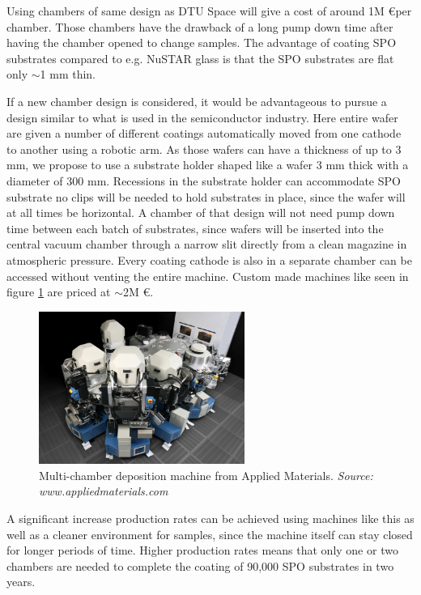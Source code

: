 Using chambers of same design as DTU Space will give a cost of around 1M \euro per chamber. Those chambers have the drawback of a long pump down time after having the chamber opened to change samples. The advantage of coating SPO substrates compared to e.g. NuSTAR glass is that the SPO substrates are flat only $\sim$1 mm thin.

If a new chamber design is considered, it would be advantageous to pursue a design similar to what is used in the semiconductor industry. Here entire wafer are given a number of different coatings automatically moved from one cathode to another using a robotic arm. As those wafers can have a thickness of up to 3 mm, we propose to use a substrate holder shaped like a wafer 3 mm thick with a diameter of 300 mm. Recessions in the substrate holder can accommodate SPO substrate no clips will be needed to hold substrates in place, since the wafer will at all times be horizontal. A chamber of that design will not need pump down time between each batch of substrates, since wafers will be inserted into the central vacuum chamber through a narrow slit directly from a clean magazine in atmospheric pressure. Every coating cathode is also in a separate chamber can be accessed without venting the entire machine. Custom made machines like seen in figure \ref{fig:dram} are priced at $\sim$2M \euro.

\begin{figure}[htbp]
	\centering
		\includegraphics[width=0.6\textwidth]{figures/athena/dram.jpeg}
	\caption{Multi-chamber deposition machine from Applied Materials. \emph{Source: www.appliedmaterials.com}}
	\label{fig:dram}
\end{figure}

A significant increase production rates can be achieved using machines like this as well as a cleaner environment for samples, since the machine itself can stay closed for longer periods of time. Higher production rates means that only one or two chambers are needed to complete the coating of 90,000 SPO substrates in two years.

